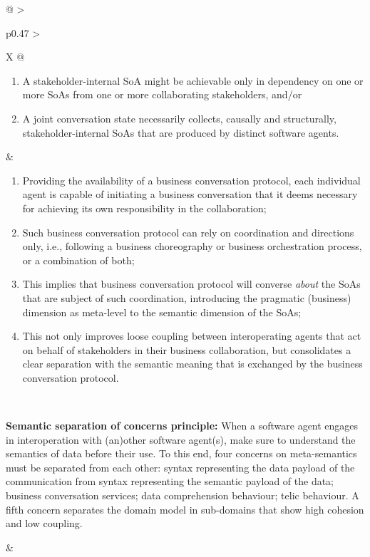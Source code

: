 \begin{xltabular}[l]{\linewidth}{@{} >{\small\raggedright\arraybackslash}p{0.47\linewidth} >{\small\raggedright\arraybackslash}X @{}}
\begin{enumerate}[left=6pt, nosep]
\begin{enumerate}
    \item A stakeholder-internal SoA might be achievable only in dependency on one or more SoAs from one or more collaborating stakeholders, and/or
    \item A joint conversation state necessarily collects, causally and structurally, stakeholder-internal SoAs that are produced by distinct software agents.
  \end{enumerate}
\end{enumerate}
&
\begin{enumerate}[left=10pt, nosep]
  \item Providing the availability of a business conversation protocol, each individual agent is capable of initiating a business conversation that it deems necessary for achieving its own responsibility in the collaboration;
  \item Such business conversation protocol can rely on coordination and directions only, i.e., following a business choreography or business orchestration process, or a combination of both;
  \item This implies that business conversation protocol will converse \emph{about} the SoAs that are subject of such coordination, introducing the pragmatic (business) dimension as meta-level to the semantic dimension of the SoAs;
  \item This not only improves loose coupling between interoperating agents that act on behalf of stakeholders in their business collaboration, but consolidates a clear separation with the semantic meaning that is exchanged by the business conversation protocol.
\end{enumerate} \\
%
%
%
\begin{mmdp}\label{dp:ssoc}{\bfseries Semantic separation of concerns principle:}
\quad When a software agent engages in interoperation with (an)other software agent(s), make sure to understand the semantics of data before their use. To this end, four concerns on meta-semantics must be separated from each other: syntax representing the data payload of the communication from syntax representing the semantic payload of the data; business conversation services; data comprehension behaviour; telic behaviour. A fifth concern separates the domain model in sub-domains that show high cohesion and low coupling. \end{mmdp}
&
\begin{description}[labelwidth=3.7cm,leftmargin=3.7cm+1ex,nosep,topsep=2ex,labelsep=1ex,font=\bfseries]

\end{description}
\end{xltabular}

